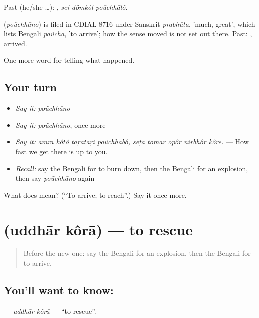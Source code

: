 Past (he/she …):   , \emph{sei dômkôl poũchhālô}.

\begin{cousinweb}
\textbf{} (\emph{poũchhāno}) is filed in CDIAL 8716 under Sanskrit \emph{prabhūta}, 'much, great', which lists Bengali \emph{paũchā}, 'to arrive'; how the sense moved is not set out there. Past: , arrived.
\end{cousinweb}

\begin{grammarlens}[title={What you've built}]
One more word for telling what happened.
\end{grammarlens}

\subsection*{Your turn}
\begin{itemize}
\raggedright
  \item \emph{Say it:} \emph{poũchhāno}
  \item \emph{Say it:} \emph{poũchhāno}, once more
  \item \emph{Say it:} \emph{āmrā kôtô tāṛātāṛi poũchhābô, seṭā tomār opôr nirbhôr kôre.} — How fast we get there is up to you.
  \item \emph{Recall:} say the Bengali for to burn down, then the Bengali for an explosion, then say \emph{poũchhāno} again
\end{itemize}

\begin{tcolorbox}[breakable,colback=teal!4,colframe=teal!35!black,title={Before you move on}]
What does  mean? (\textquotedblleft{}To arrive; to reach\textquotedblright{}.) Say it once more.
\end{tcolorbox}
\section[\texorpdfstring{\bn{উদ্ধার} \bn{করা} (uddhār kôrā)}{উদ্ধার করা (uddhār kôrā)}]{  (uddhār kôrā) — to rescue}

\label{lesson:BN-C280-uddhar-kora}



\begin{quote}
Before the new one: say the Bengali for an explosion, then the Bengali for to arrive.
\end{quote}

\subsection*{You'll want to know:  }
\textbf{ } — \emph{uddhār kôrā} — \textquotedblleft{}to rescue\textquotedblright{}.

